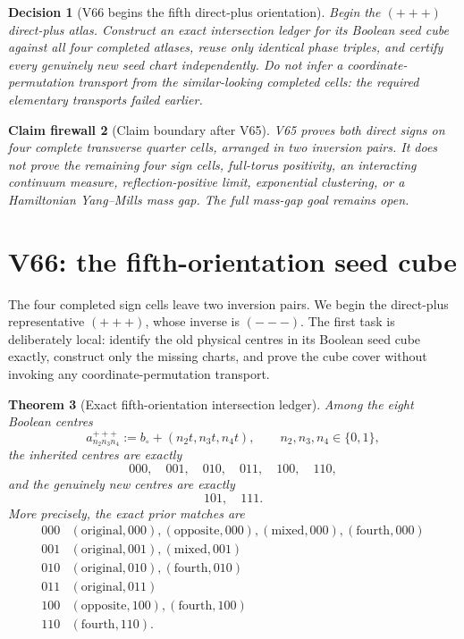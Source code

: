 \documentclass[11pt,oneside]{article}
\newtheorem{theorem}{Theorem}[section]
\newtheorem{firewall}[theorem]{Claim firewall}
\newtheorem{decision}[theorem]{Decision}
\theoremstyle{definition}
\theoremstyle{remark}
\begin{document}
\begin{decision}[V66 begins the fifth direct-plus orientation]
\label{dec:newv65-next}
Begin the \((+++)\) direct-plus atlas.  Construct an exact
intersection ledger for its Boolean seed cube against all four
completed atlases, reuse only identical phase triples, and certify
every genuinely new seed chart independently.  Do not infer a
coordinate-permutation transport from the similar-looking completed
cells: the required elementary transports failed earlier.
\end{decision}

\begin{firewall}[Claim boundary after V65]
\label{fire:newv65-final}
V65 proves both direct signs on four complete transverse quarter
cells, arranged in two inversion pairs.  It does not prove the
remaining four sign cells, full-torus positivity, an interacting
continuum measure, reflection-positive limit, exponential
clustering, or a Hamiltonian Yang--Mills mass gap.  The full
mass-gap goal remains open.
\end{firewall}

\section{V66: the fifth-orientation seed cube}
\label{sec:newv66-fifth-seed}

The four completed sign cells leave two inversion pairs.  We begin
the direct-plus representative \((+++)\), whose inverse is
\((---)\).  The first task is deliberately local: identify the old
physical centres in its Boolean seed cube exactly, construct only
the missing charts, and prove the cube cover without invoking any
coordinate-permutation transport.

\begin{theorem}[Exact fifth-orientation intersection ledger]
\label{thm:newv66-intersections}
Among the eight Boolean centres
\[
 a^{+++}_{n_2n_3n_4}
 :=b_\circ+(n_2t,n_3t,n_4t),
 \qquad n_2,n_3,n_4\in\{0,1\},                       \tag{66.1}
\]
the inherited centres are exactly
\[
 000,\quad001,\quad010,\quad011,\quad100,\quad110,   \tag{66.2}
\]
and the genuinely new centres are exactly
\[
 101,\quad111.                                       \tag{66.3}
\]
More precisely, the exact prior matches are
\[
\begin{array}{c|l}
000&(\mathrm{original},000),(\mathrm{opposite},000),
     (\mathrm{mixed},000),(\mathrm{fourth},000)\\
001&(\mathrm{original},001),(\mathrm{mixed},001)\\
010&(\mathrm{original},010),(\mathrm{fourth},010)\\
011&(\mathrm{original},011)\\
100&(\mathrm{opposite},100),(\mathrm{fourth},100)\\
110&(\mathrm{fourth},110).
\end{array}                                           \tag{66.4}
\]
\end{theorem}
\end{document}
